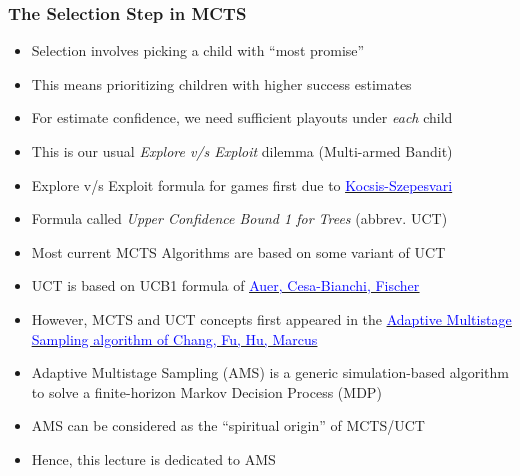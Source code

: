 \documentclass[handout]{beamer}
\begin{document}
\begin{frame}
\frametitle{The Selection Step in MCTS}
\pause
\begin{itemize}[<+->]
\item Selection involves picking a child with ``most promise''
\item This means prioritizing children with higher success estimates
\item For estimate confidence, we need sufficient playouts under {\em each} child
\item This is our usual {\em Explore v/s Exploit} dilemma (Multi-armed Bandit)
\item Explore v/s Exploit formula for games first due to \href{http://ggp.stanford.edu/readings/uct.pdf}{\underline{\textcolor{blue}{Kocsis-Szepesvari}}}
\item Formula called {\em Upper Confidence Bound 1 for Trees} (abbrev. UCT)
\item Most current MCTS Algorithms are based on some variant of UCT
\item UCT is based on UCB1 formula of \href{https://homes.di.unimi.it/cesa-bianchi/Pubblicazioni/ml-02.pdf}{\underline{\textcolor{blue}{Auer, Cesa-Bianchi, Fischer}}}
\item However, MCTS and UCT concepts first appeared in the \href{https://pdfs.semanticscholar.org/a378/b2895a3e3f6a19cdff1a0ad404b301b5545f.pdf}{\underline{\textcolor{blue}{Adaptive Multistage Sampling algorithm of Chang, Fu, Hu, Marcus}}}
\item Adaptive Multistage Sampling (AMS) is a generic simulation-based algorithm to solve a finite-horizon Markov Decision Process (MDP)
\item AMS can be considered as the ``spiritual origin'' of MCTS/UCT
\item Hence, this lecture is dedicated to AMS
\end{itemize}
\end{frame}
\end{document}
